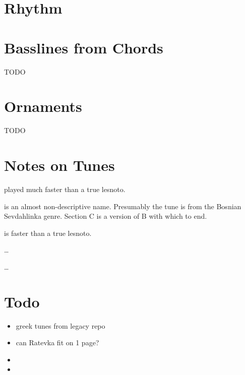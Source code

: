
\section{Rhythm}
\begin{center}
\end{center}

\section{Basslines from Chords}
TODO

\section{Ornaments}
TODO

\section{Notes on Tunes}
\begin{description}[noitemsep]
\item[Ratevka] played much faster than a true lesnoto.
\item[Sevda] is an almost non-descriptive name.
	Presumably the tune is from the Bosnian Sevdahlinka
	genre.
	Section C is a version of B with which to end.
\item[Četvorno Šopsko Horo] is faster than a true lesnoto.
\item[TODO] \dots
\item[TODO] \dots
\end{description}

\section{Todo}
\begin{itemize}
\item greek tunes from legacy repo
\item can Ratevka fit on 1 page?
\item
\item
\end{itemize}


